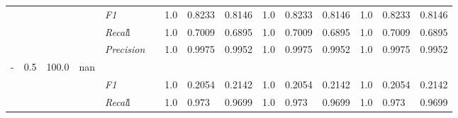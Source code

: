 \begin{table}[]
\begin{tabularx}{\textwidth}{XXlllllllllllll@{}}
                                                                    &                                                                     &                                                           &    & \textit{F1} &                                                      & 1.0        & 0.8233        & 0.8146        & 1.0        & 0.8233        & 0.8146        & 1.0        & 0.8233        & 0.8146        \\
                                                                    &                                                                     &                                                           &    & \textit{Recal}l &                                                      & 1.0    & 0.7009    & 0.6895    & 1.0    & 0.7009    & 0.6895    & 1.0    & 0.7009    & 0.6895    \\
                                                                    &                                                                     &                                                           &    & \textit{Precision} &                                                      & 1.0 & 0.9975 & 0.9952 & 1.0 & 0.9975 & 0.9952 & 1.0 & 0.9975 & 0.9952 \\ \midrule
- & 0.5 & 100.0 & nan &                                                              &                                                                   &                                                             &                                                               &                                                                    &                                                              &                                                               &                                                                    &                                                              \\
                                                                    &                                                                     &                                                           &    & \textit{F1} &                                                      & 1.0        & 0.2054        & 0.2142        & 1.0        & 0.2054        & 0.2142        & 1.0        & 0.2054        & 0.2142        \\
                                                                    &                                                                     &                                                           &    & \textit{Recal}l &                                                      & 1.0    & 0.973    & 0.9699    & 1.0    & 0.973    & 0.9699    & 1.0    & 0.973    & 0.9699    \\

\end{tabularx}
\end{table}
